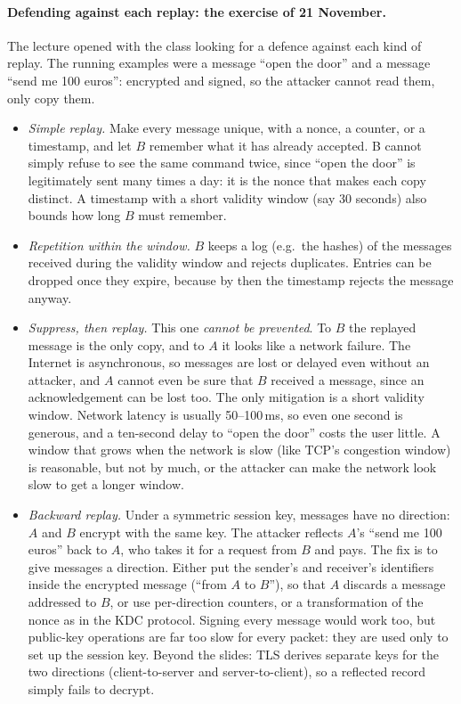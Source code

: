 \paragraph{Defending against each replay: the exercise of 21 November.} The lecture opened with the class looking for a defence against each kind of replay. The running examples were a message \enquote{open the door} and a message \enquote{send me 100 euros}: encrypted and signed, so the attacker cannot read them, only copy them.
\begin{itemize}
    \item \emph{Simple replay.} Make every message unique, with a nonce, a counter, or a timestamp, and let $B$ remember what it has already accepted. B cannot simply refuse to see the same command twice, since \enquote{open the door} is legitimately sent many times a day: it is the nonce that makes each copy distinct. A timestamp with a short validity window (say 30 seconds) also bounds how long $B$ must remember.
    \item \emph{Repetition within the window.} $B$ keeps a log (e.g.\ the hashes) of the messages received during the validity window and rejects duplicates. Entries can be dropped once they expire, because by then the timestamp rejects the message anyway.
    \item \emph{Suppress, then replay.} This one \emph{cannot be prevented}. To $B$ the replayed message is the only copy, and to $A$ it looks like a network failure. The Internet is asynchronous, so messages are lost or delayed even without an attacker, and $A$ cannot even be sure that $B$ received a message, since an acknowledgement can be lost too. The only mitigation is a short validity window. Network latency is usually 50--100\,ms, so even one second is generous, and a ten-second delay to \enquote{open the door} costs the user little. A window that grows when the network is slow (like TCP's congestion window) is reasonable, but not by much, or the attacker can make the network look slow to get a longer window.
    \item \emph{Backward replay.} Under a symmetric session key, messages have no direction: $A$ and $B$ encrypt with the same key. The attacker reflects $A$'s \enquote{send me 100 euros} back to $A$, who takes it for a request from $B$ and pays. The fix is to give messages a direction. Either put the sender's and receiver's identifiers inside the encrypted message (\enquote{from $A$ to $B$}), so that $A$ discards a message addressed to $B$, or use per-direction counters, or a transformation of the nonce as in the KDC protocol. Signing every message would work too, but public-key operations are far too slow for every packet: they are used only to set up the session key. Beyond the slides: TLS derives separate keys for the two directions (client-to-server and server-to-client), so a reflected record simply fails to decrypt.
\end{itemize}

